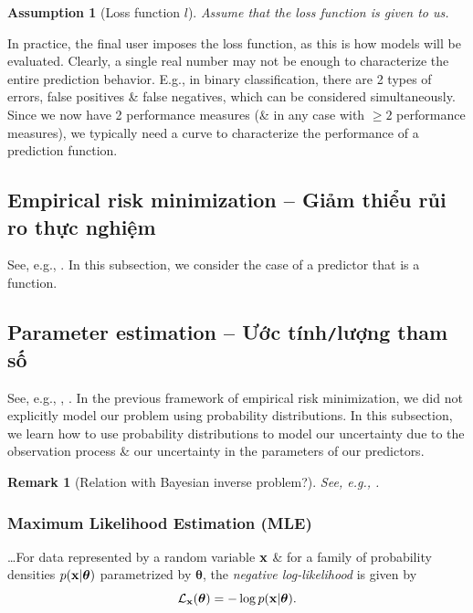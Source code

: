 \documentclass{article}
\newtheorem{assumption}{Assumption}
\newtheorem{remark}{Remark}
\begin{document}
\begin{assumption}[Loss function $l$]
	Assume that the loss function is given to us.
\end{assumption}
In practice, the final user imposes the loss function, as this is how models will be evaluated. Clearly, a single real number may not be enough to characterize the entire prediction behavior. E.g., in binary classification, there are 2 types of errors, false positives \& false negatives, which can be considered simultaneously. Since we now have 2 performance measures (\& in any case with $\ge2$ performance measures), we typically need a curve to characterize the performance of a prediction function.


\subsection{Empirical risk minimization -- Giảm thiểu rủi ro thực nghiệm}
See, e.g., \cite[Sect. 8.2: Empirical Risk Minimization]{Deisenroth_Faisal_Ong2024}. In this subsection, we consider the case of a predictor that is a function.


\subsection{Parameter estimation -- Ước tính{\tt/}lượng tham số}
See, e.g., \cite[Sect. 8.3: Parameter Estimation]{Deisenroth_Faisal_Ong2024}, \cite{Aster_Borchers_Thurber2018}. In the previous framework of empirical risk minimization, we did not explicitly model our problem using probability distributions. In this subsection, we learn how to use probability distributions to model our uncertainty due to the observation process \& our uncertainty in the parameters of our predictors. 

\begin{remark}[Relation with Bayesian inverse problem?]
	See, e.g., \cite{Ito_Jin2015}.
\end{remark}


\subsubsection{Maximum Likelihood Estimation (MLE)}
\ldots For data represented by a random variable ${\bf x}$ \& for a family of probability densities $p({\bf x}|\boldsymbol{\theta})$ parametrized by $\boldsymbol{\theta}$, the {\it negative log-likelihood} is given by
\begin{equation}
	{\cal L}_{\bf x}(\boldsymbol{\theta}) = -\log p({\bf x}|\boldsymbol{\theta}).
\end{equation}
\end{document}
